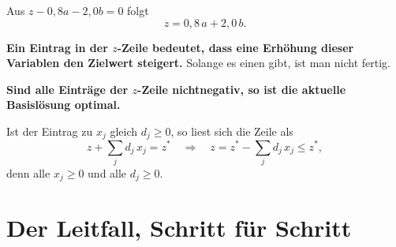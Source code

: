\begin{merksatz}
Aus $z - 0{,}8a - 2{,}0b = 0$ folgt
\[ z = 0{,}8\,a + 2{,}0\,b . \]

\begin{center}
\begin{minipage}{0.9\textwidth}
\textbf{Ein  Eintrag in der $z$-Zeile bedeutet, dass eine Erhöhung dieser Variablen den Zielwert steigert.} Solange es einen gibt, ist man nicht fertig.
\end{minipage}
\end{center}

\begin{center}
\begin{minipage}{0.9\textwidth}
\textbf{Sind alle Einträge der $z$-Zeile nichtnegativ, so ist die aktuelle Basislösung optimal.}
\end{minipage}
\end{center}

 Ist der Eintrag zu $x_j$ gleich $d_j \ge 0$, so liest sich die Zeile als
\[ z + \sum_j d_j\,x_j = z^{*} \quad\Longrightarrow\quad z = z^{*} - \sum_j d_j\,x_j \le z^{*} , \]
denn alle $x_j \ge 0$ und alle $d_j \ge 0$.

\begin{center}
\begin{minipage}{0.88\textwidth}
\end{minipage}
\end{center}
\end{merksatz}

\section{Der Leitfall, Schritt für Schritt}

